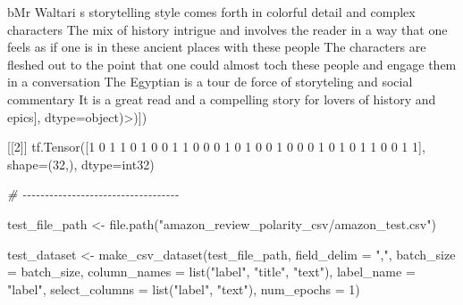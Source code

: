\documentclass[
]{article}
\newenvironment{Shaded}{}{}
\newcommand{\AttributeTok}[1]{\textcolor[rgb]{0.49,0.56,0.16}{#1}}
\newcommand{\CommentTok}[1]{\textcolor[rgb]{0.38,0.63,0.69}{\textit{#1}}}
\newcommand{\DecValTok}[1]{\textcolor[rgb]{0.25,0.63,0.44}{#1}}
\newcommand{\FunctionTok}[1]{\textcolor[rgb]{0.02,0.16,0.49}{#1}}
\newcommand{\NormalTok}[1]{#1}
\newcommand{\OtherTok}[1]{\textcolor[rgb]{0.00,0.44,0.13}{#1}}
\newcommand{\SpecialCharTok}[1]{\textcolor[rgb]{0.25,0.44,0.63}{#1}}
\newcommand{\StringTok}[1]{\textcolor[rgb]{0.25,0.44,0.63}{#1}}
\begin{document}
\begin{Shaded}
\begin{Highlighting}[]
\NormalTok{       b}\StringTok{\textquotesingle{}Mr Waltari s storytelling style comes forth in colorful detail and complex characters The mix of history intrigue and involves the reader in a way that one feels as if one is in these ancient places with these people The characters are fleshed out to the point that one could almost toch these people and engage them in a conversation The Egyptian is a tour de force of storyteling and social commentary It is a great read and a compelling story for lovers of history and epics\textquotesingle{}}\NormalTok{],}
      \AttributeTok{dtype=}\NormalTok{object)}\SpecialCharTok{\textgreater{}}\NormalTok{)])}

\NormalTok{[[}\DecValTok{2}\NormalTok{]]}
\FunctionTok{tf.Tensor}\NormalTok{([}\DecValTok{1} \DecValTok{0} \DecValTok{1} \DecValTok{1} \DecValTok{0} \DecValTok{1} \DecValTok{0} \DecValTok{0} \DecValTok{1} \DecValTok{1} \DecValTok{0} \DecValTok{0} \DecValTok{0} \DecValTok{1} \DecValTok{0} \DecValTok{1} \DecValTok{0} \DecValTok{0} \DecValTok{1} \DecValTok{0} \DecValTok{0} \DecValTok{0} \DecValTok{1} \DecValTok{0} \DecValTok{1} \DecValTok{0} \DecValTok{1} \DecValTok{1} \DecValTok{0} \DecValTok{0} \DecValTok{1} \DecValTok{1}\NormalTok{], }\AttributeTok{shape=}\NormalTok{(}\DecValTok{32}\NormalTok{,), }\AttributeTok{dtype=}\NormalTok{int32)}

\CommentTok{\# {-}{-}{-}{-}{-}{-}{-}{-}{-}{-}{-}{-}{-}{-}{-}{-}{-}{-}{-}{-}{-}{-}{-}{-}{-}{-}{-}{-}{-}{-}{-}{-}{-}{-}{-}}

\NormalTok{test\_file\_path }\OtherTok{\textless{}{-}} \FunctionTok{file.path}\NormalTok{(}\StringTok{"amazon\_review\_polarity\_csv/amazon\_test.csv"}\NormalTok{)}


\NormalTok{test\_dataset }\OtherTok{\textless{}{-}} \FunctionTok{make\_csv\_dataset}\NormalTok{(test\_file\_path, }\AttributeTok{field\_delim =} \StringTok{","}\NormalTok{, }\AttributeTok{batch\_size =}\NormalTok{ batch\_size,}
    \AttributeTok{column\_names =} \FunctionTok{list}\NormalTok{(}\StringTok{"label"}\NormalTok{, }\StringTok{"title"}\NormalTok{, }\StringTok{"text"}\NormalTok{), }\AttributeTok{label\_name =} \StringTok{"label"}\NormalTok{, }\AttributeTok{select\_columns =} \FunctionTok{list}\NormalTok{(}\StringTok{"label"}\NormalTok{,}
        \StringTok{"text"}\NormalTok{), }\AttributeTok{num\_epochs =} \DecValTok{1}\NormalTok{)}


\end{Highlighting}
\end{Shaded}
\end{document}

